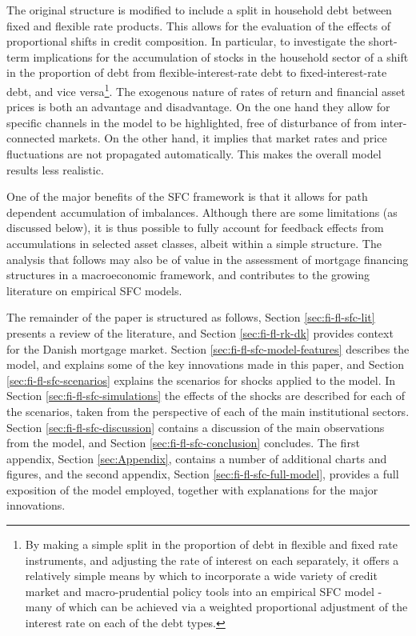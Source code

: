 \documentclass[
]{book}
\begin{document}
The original structure is modified to include a split in household debt between fixed and flexible rate products. This allows for the evaluation of the effects of proportional shifts in credit composition. In particular, to investigate the short-term implications for the accumulation of stocks in the household sector of a shift in the proportion of debt from flexible-interest-rate debt to fixed-interest-rate debt, and vice versa\footnote{By making a simple split in the proportion of debt in flexible and fixed rate instruments, and adjusting the rate of interest on each separately, it offers a relatively simple means by which to incorporate a wide variety of credit market and macro-prudential policy tools into an empirical SFC model - many of which can be achieved via a weighted proportional adjustment of the interest rate on each of the debt types.}. The exogenous nature of rates of return and financial asset prices is both an advantage and disadvantage. On the one hand they allow for specific channels in the model to be highlighted, free of disturbance of from inter-connected markets. On the other hand, it implies that market rates and price fluctuations are not propagated automatically. This makes the overall model results less realistic.

One of the major benefits of the SFC framework is that it allows for path dependent accumulation of imbalances. Although there are some limitations (as discussed below), it is thus possible to fully account for feedback effects from accumulations in selected asset classes, albeit within a simple structure. The analysis that follows may also be of value in the assessment of mortgage financing structures in a macroeconomic framework, and contributes to the growing literature on empirical SFC models.

The remainder of the paper is structured as follows,
Section \ref{sec:fi-fl-sfc-lit} presents a review of the literature, and
Section \ref{sec:fi-fl-rk-dk} provides context for the Danish mortgage market.
Section \ref{sec:fi-fl-sfc-model-features} describes the model, and explains some of the key innovations made in this paper, and
Section \ref{sec:fi-fl-sfc-scenarios} explains the scenarios for shocks applied to the model.
In Section \ref{sec:fi-fl-sfc-simulations} the effects of the shocks are described for each of the scenarios, taken from the perspective of each of the main institutional sectors.
Section \ref{sec:fi-fl-sfc-discussion} contains a discussion of the main observations from the model, and
Section \ref{sec:fi-fl-sfc-conclusion} concludes. The first appendix,
Section \ref{sec:Appendix}, contains a number of additional charts and figures, and the second appendix,
Section \ref{sec:fi-fl-sfc-full-model}, provides a full exposition of the model employed, together with explanations for the major innovations.
\end{document}
